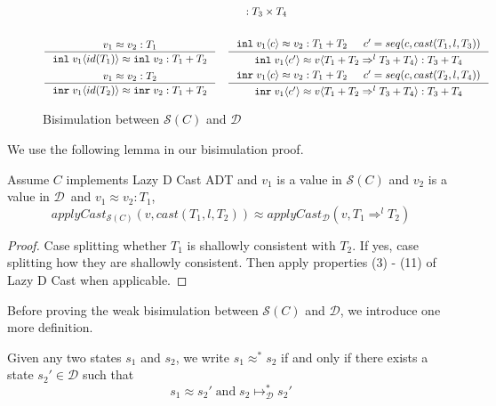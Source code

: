\documentclass[acmsmall,review,anonymous]{acmart}\settopmatter{printfolios=true,printccs=false,printacmref=false}
\newcommand{\plus}[0]{+}
\newcommand{\POOprod}[2]{#1 \times #2}
\newcommand{\POOsum}[2]{#1 \plus #2}
\newcommand{\cOOcast}[3]{#1 \Rightarrow^{#2} #3}
\newcommand{\vOOcast}[2]{#1\langle#2\rangle}
\newcommand{\vOOinl}[1]{\mathtt{inl}\;#1}
\newcommand{\vOOinr}[1]{\mathtt{inr}\;#1}
\newcommand{\hcvOOinl}[2]{\mathtt{inl}\;#1\langle#2\rangle}
\newcommand{\hcvOOinr}[2]{\mathtt{inr}\;#1\langle#2\rangle}
\newcommand{\ineffCEKD}{$\mathcal{D}$}
\newcommand{\judgeDreduceTrans}[2]{#1 \longmapsto_{\mathcal{D}}^{*} #2}
\newcommand{\effCEK}[1]{$\mathcal{S}(#1)$}
\begin{document}
\begin{figure}
\begin{gather*}
{		: \POOprod{T_3}{T_4}
	}
\\ \\
	\inference{
		v_1 \approx v_2 : T_1
	}{
		\hcvOOinl{v_1}{id(T_1)} \approx \vOOinl{v_2}
		: \POOsum{T_1}{T_2}
	}
	\quad
	\inference{
		\hcvOOinl{v_1}{c} \approx v_2
		: \POOsum{T_1}{T_2} &
		c' = seq(c,cast(T_1,l,T_3))
	}{
		\hcvOOinl{v_1}{c'} \approx
		\vOOcast{v}{\cOOcast{\POOsum{T_1}{T_2}}{l}{\POOsum{T_3}{T_4}}}
		: \POOsum{T_3}{T_4}	
	}
	\\
	\inference{
	v_1 \approx v_2 : T_2
	}{
	\hcvOOinr{v_1}{id(T_2)} \approx \vOOinr{v_2}
	: \POOsum{T_1}{T_2}
	}
	\quad
	\inference{
	\hcvOOinr{v_1}{c} \approx v_2
	: \POOsum{T_1}{T_2} &
	c' = seq(c,cast(T_2,l,T_4))
	}{
	\hcvOOinr{v_1}{c'} \approx
	\vOOcast{v}{\cOOcast{\POOsum{T_1}{T_2}}{l}{\POOsum{T_3}{T_4}}}
	: \POOsum{T_3}{T_4}
	}
	\end{gather*}
	\caption{Bisimulation between \effCEK{C} and \ineffCEKD}
	\label{fig:bisim-SC-D}
\end{figure}


We use the following lemma in our bisimulation proof.

\begin{lemma}[SoAndSo]
	Assume $C$ implements Lazy D Cast ADT
	and $v_1$ is a value in \effCEK{C}
	and $v_2$ is a value in \ineffCEKD\
	and $v_1 \approx v_2 : T_1$,
	\[
	applyCast_{\text{\effCEK{C}}}(v,cast(T_1,l,T_2)) 
	\approx 
	applyCast_{\text{\ineffCEKD}}(v,\cOOcast{T_1}{l}{T_2})
	\]
\end{lemma}
\begin{proof}
	Case splitting whether $T_1$ is shallowly consistent with $T_2$.
	If yes, case splitting how they are shallowly consistent.
	Then apply properties (3) - (11) of Lazy D Cast when applicable.
\end{proof}

Before proving the weak bisimulation between \effCEK{C} and \ineffCEKD, we 
introduce one more definition.

\begin{definition}[$s \approx^{*} s$]
Given any two states $s_1$ and $s_2$, we write $s_1 \approx^{*} s_2$
if and only if there exists a state $s_2' \in \text{\ineffCEKD}$ such
that
\[
s_1 \approx s_2'
\;\text{and}\;
\judgeDreduceTrans{s_2}{s_2'}
\]
\end{definition}
\end{document}
